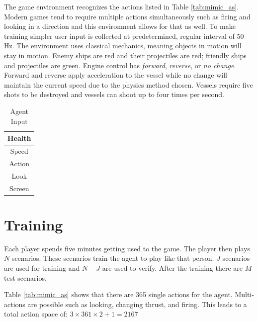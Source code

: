 \documentclass[12pt]{thesis}
\begin{document}
The game environment recognizes the actions listed in Table \ref{tab:mimic_as}. 
Modern games tend to require multiple actions simultaneously such as firing and 
looking in a direction and this environment allows for that as well. To make 
training simpler user input is collected at predetermined, regular interval of 
50 Hz. %
The environment uses classical mechanics, meaning objects in motion will stay in 
motion. Enemy ships are red and their projectiles are red; friendly ships and 
projectiles are green. Engine control has \textit{forward}, \textit{reverse}, 
or \textit{no change}. Forward and reverse apply acceleration to the vessel 
while no change will maintain the current speed due to the physics method 
chosen. Vessels require five shots to be destroyed and vessels can shoot up to 
four times per second.

\begin{table}
  \caption{Agent Input}
  \begin{center}
    \begin{tabular}{ | c | }
      \hline
      Health \\ \hline
      Speed \\ \hline
      Action \\ \hline
      Look \\ \hline
      Screen \\ \hline
    \end{tabular}
  \end{center}
  \label{tab:agent_input}
\end{table}

\section{Training}
Each player spends five minutes getting used to the game. The player then plays 
$N$ %
scenarios. These scenarios train the agent to play like that person. $J$ 
scenarios are used for training and $N - J$ are used to verify. After 
the training there are $M$ %
test scenarios. 

Table \ref{tab:mimic_as} shows that there are 365 single actions for the agent. 
Multi-actions are possible such as looking, changing thrust, and firing. This 
leads to a total action space of: $ 3 \times 361 \times 2 + 1 = 2167$
\end{document}
